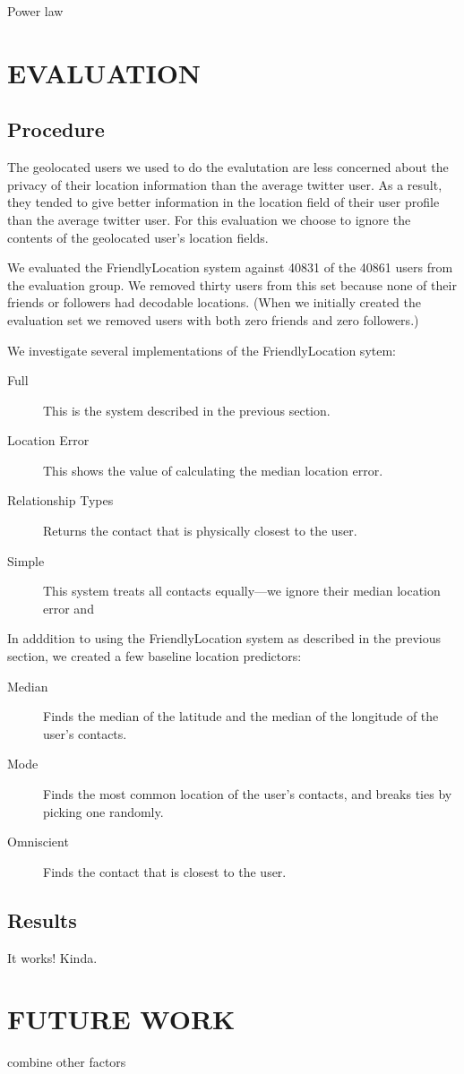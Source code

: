 \documentclass{sig-alternate}
\begin{document}
Power law


\section{EVALUATION}
\subsection{Procedure}
The geolocated users we used to do the evalutation are less concerned about the
privacy of their location information than the average twitter user.
As a result, they tended to give better information in the location field of
their user profile than the average twitter user.
For this evaluation we choose to ignore the contents of the geolocated user's
location fields.

We evaluated the FriendlyLocation system against 40831 of the 40861 users from the evaluation group.
We removed thirty users from this set because none of their friends or
followers had decodable locations.
(When we initially created the evaluation
set we removed users with both zero friends and zero followers.)

We investigate several implementations of the FriendlyLocation sytem:
\begin{description}
\item[Full] This is the system described in the previous section.
\item[Location Error] This shows the value of calculating the median location error.
\item[Relationship Types] Returns the contact that is physically closest to the user.
\item[Simple] This system treats all contacts equally---we ignore their median location error and 
\end{description}

In adddition to using the FriendlyLocation system as described in the previous section, we created a few baseline location predictors:
\begin{description}
\item[Median] Finds the median of the latitude and the median of the longitude of the user's contacts.
\item[Mode] Finds the most common location of the user's contacts, and breaks ties by picking one randomly.
\item[Omniscient] Finds the contact that is closest to the user.
\end{description}

\subsection{Results}

It works! Kinda.

\section{FUTURE WORK}
combine other factors


 
\end{document}
